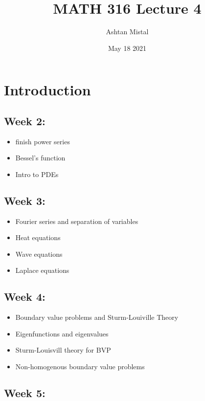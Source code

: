 \documentclass{article}
\title{MATH 316 Lecture 4}
\author{Ashtan Mistal}
\date{May 18 2021}
\begin{document}
\ifstandalone
\maketitle
\fi

\graphicspath{{./Lecture04/}}

\section{Introduction}

\subsection{Week 2:}

\begin{itemize}
    \item finish power series
    \item Bessel's function
    \item Intro to PDEs
\end{itemize}

\subsection{Week 3:}

\begin{itemize}
    \item Fourier series and separation of variables
    \item Heat equations
    \item Wave equations
    \item Laplace equations
\end{itemize}

\subsection{Week 4:}

\begin{itemize}
    \item Boundary value problems and Sturm-Louiville Theory
    \item Eigenfunctions and eigenvalues
    \item Sturm-Louisvill theory for BVP
    \item Non-homogenous boundary value problems
\end{itemize}

\subsection{Week 5:}
\end{document}
